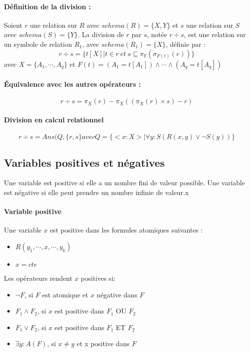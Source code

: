 \documentclass[10pt,a4paper]{article}
\begin{document}
\paragraph{Définition de la division :} Soient $r$ une relation sur $R$ avec $schema(R)=\{X,Y\}$ et $s$ une relation sur $S$ avec $schema(S)=\{Y\}$. La division de $r$ par $s$, notée $r \div s$, est une relation sur un symbole de relation $R_{1}$, avec $schema(R_{1})=\{X\}$, définie par :
$$r \div s = \{t[X] | t \in r\ et\ s \subseteq \pi_{Y}(\sigma_{F(t)}(r))\}$$
avec $X=\{A_{1}, \cdots, A_{q}\}$ et $F(t)=(A_{1} = t[A_{1}])\wedge \cdots \wedge (A_{q} = t[A_{q}])$

\paragraph{Équivalence avec les autres opérateurs :} 
$$r \div s = \pi_{X}(r)-\pi_{X}((\pi_{X}(r) \times s)-r)$$

\paragraph{Division en calcul relationnel}
$$r \div s = Ans(Q,\{r,s\} avec Q=\{<x:X>|\forall y:S(R(x,y) \vee \neg S(y))\}$$
\subsection{Variables positives et négatives}
Une variable est positive si elle a un nombre fini de valeur possible. Une variable est négative si elle peut prendre un nombre infinie de valeur.x

\paragraph{Variable positive \\}
Une variable $x$ est positive dans les formules atomiques suivantes :
\begin{itemize}
\item $R(y_{1},\cdots,x,\cdots,y_{k})$
\item $x=cte$
\end{itemize}

Les opérateurs rendent $x$ positives si:
\begin{itemize}
\item $\neg F$, si $F$ est atomique et $x$ négative dans $F$
\item $F_{1} \wedge F_{2}$, si $x$ est positive dans $F_{1}$ OU $F_{2}$
\item $F_{1} \vee F_{2}$, si $x$ est positive dans $F_{1}$ ET $F_{2}$
\item $\exists y : A(F)$, si $x \neq y$ et x positive dans $F$
\end{itemize}
\end{document}
